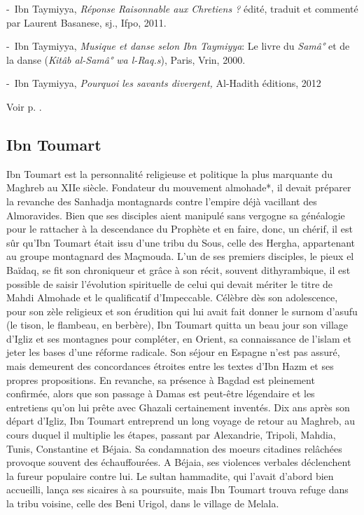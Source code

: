 -~Ibn Taymiyya, \emph{Réponse Raisonnable aux Chretiens ?} édité,
traduit et commenté par Laurent Basanese, sj., Ifpo, 2011.

-~Ibn Taymiyya, \emph{Musique et danse selon Ibn Taymiyya}: Le livre du
\emph{Samâ°} et de la danse (\emph{Kitâb al-Samâ° wa l-Raq.s}), Paris,
Vrin, 2000.

-~Ibn Taymiyya, \emph{Pourquoi les savants divergent,} Al-Hadith
éditions, 2012


Voir p. \pageref{ibn-taymiyya}.


\subsection{Ibn Toumart}
\label{IbnToumart}


Ibn Toumart est la personnalité religieuse et politique la plus marquante du Maghreb au
XIIe siècle. Fondateur du mouvement almohade*, il devait préparer la revanche des Sanhadja
montagnards contre l’empire déjà vacillant des Almoravides. Bien que ses disciples aient
manipulé sans vergogne sa généalogie pour le rattacher à la descendance du Prophète et en
faire, donc, un chérif, il est sûr qu’Ibn Toumart était issu d’une tribu du Sous, celle des Hergha,
appartenant au groupe montagnard des Maçmouda.
 L’un de ses premiers disciples, le pieux el Baïdaq, se fit son chroniqueur et grâce à son
récit, souvent dithyrambique, il est possible de saisir l’évolution spirituelle de celui qui
devait mériter le titre de Mahdi Almohade et le qualificatif d’Impeccable. Célèbre dès son
adolescence, pour son zèle religieux et son érudition qui lui avait fait donner le surnom d’asufu
(le tison, le flambeau, en berbère), Ibn Toumart quitta un beau jour son village d’Igliz et
ses montagnes pour compléter, en Orient, sa connaissance de l’islam et jeter les bases d’une
réforme radicale.
 Son séjour en Espagne n’est pas assuré, mais demeurent des concordances étroites entre
les textes d’Ibn Hazm et ses propres propositions. En revanche, sa présence à Bagdad est
pleinement confirmée, alors que son passage à Damas est peut-être légendaire et les entretiens
qu’on lui prête avec Ghazali certainement inventés.
 Dix ans après son départ d’Igliz, Ibn Toumart entreprend un long voyage de retour au Maghreb,
au cours duquel il multiplie les étapes, passant par Alexandrie, Tripoli, Mahdia, Tunis,
Constantine et Béjaia. Sa condamnation des moeurs citadines relâchées provoque souvent des
échauffourées. A Béjaia, ses violences verbales déclenchent la fureur populaire contre lui. Le
sultan hammadite, qui l’avait d’abord bien accueilli, lança ses sicaires à sa poursuite, mais Ibn
Toumart trouva refuge dans la tribu voisine, celle des Beni Urigol, dans le village de Melala.
